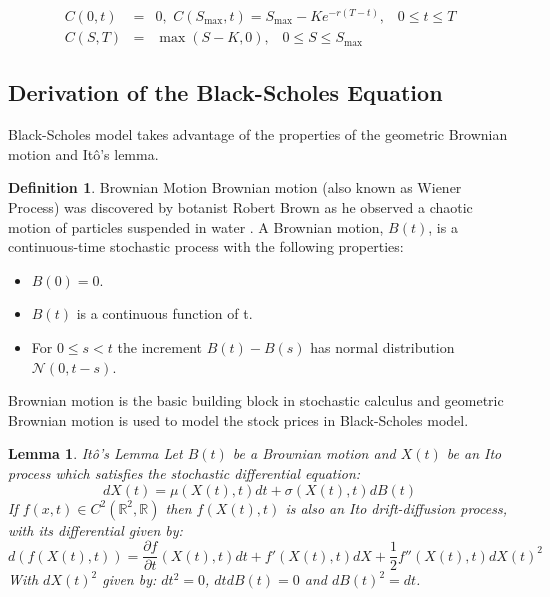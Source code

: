 \documentclass[12pt, oneside]{book}
\theoremstyle{plain}
\newtheorem{lemma}[theorem]{Lemma}
\theoremstyle{definition}
\newtheorem{definition}[theorem]{Definition}
\begin{document}
\begin{eqnarray}
C(0,t) &=& 0, \hspace{4pt} C(S_{\max},t)=S_{\max} - K e^{-r(T-t)}, \hspace{10pt} 0 \leq t \leq T \\[10pt]
C(S,T) &=& \max(S-K,0), \hspace{10pt} 0 \leq S \leq S_{\max}
\end{eqnarray}

\subsection{Derivation of the Black-Scholes Equation}
Black-Scholes model takes advantage of the properties of the geometric Brownian motion and It\^{o}'s lemma. 

\begin{definition} Brownian Motion 
Brownian motion (also known as Wiener Process) was discovered by botanist Robert Brown as he observed a chaotic motion of particles suspended in water \cite{BM}. A  Brownian  motion, $B(t)$,  is  a  continuous-time  stochastic  process  with  the  following properties: 
\begin{itemize}
\item $ B(0) = 0 $.
\item $ B(t) $ is a continuous function of t.
\item For $ 0  \leq s < t $ the increment $ B(t) -  B(s)  $ has normal distribution $ \mathcal{N}(0, t-s) $.
\end{itemize}
Brownian motion is the basic building block in stochastic calculus and geometric Brownian motion is used to model the stock prices in Black-Scholes model.
\end{definition}

\begin{lemma} It\^{o}'s Lemma
Let $B(t)$ be a Brownian motion and $X(t)$ be an Ito process which satisfies the stochastic differential equation:
\begin{equation}
dX(t) = \mu(X(t),t)dt + \sigma(X(t),t)dB(t)
\end{equation} 
If $f(x, t) \in C^2(\mathbb{R}^2,\mathbb{R})$ then $f(X(t),t)$ is also an Ito drift-diffusion process, with its differential given by:
\begin{equation}
d(f(X(t),t)) = \frac{\partial f}{\partial t}(X(t),t)dt + f'(X(t),t)dX + \frac{1}{2}f''(X(t),t)dX(t)^2
\end{equation} 
With $dX(t)^2$ given by: $dt^2 = 0$, $dt dB(t) = 0$ and $dB(t)^2 = dt$.
\end{lemma}
\end{document}
